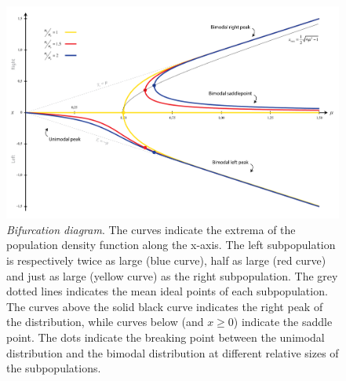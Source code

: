 \documentclass[preprint, 12pt]{elsarticle}
\begin{document}
\begin{figure}[ht!]
	\centering
	\includegraphics[width=1\textwidth, trim={0 0 0 0}]{Graphics/Bifurcation.pdf}
	\caption{\emph{Bifurcation diagram}. The curves indicate the extrema of the population density function along the x-axis. The left subpopulation is respectively twice as large (blue curve), half as large (red curve) and just as large (yellow curve) as the right subpopulation. The grey dotted lines indicates the mean ideal points of each subpopulation. The curves above the solid black curve indicates the right peak of the distribution, while curves below (and $x \ge 0$) indicate the saddle point. The dots indicate the breaking point between the unimodal distribution and the bimodal distribution at different relative sizes of the subpopulations.}
	\label{fig:bifurcation}
\end{figure}
\end{document}

